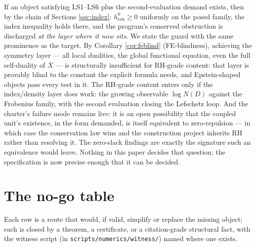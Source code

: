 \documentclass[11pt,reqno]{amsart}
\theoremstyle{plain}
\theoremstyle{definition}
\theoremstyle{remark}
\newcommand{\Xbar}{\overline{X}}
\begin{document}
If an object satisfying LS1--LS6 plus the second-evaluation demand exists, then by the chain
of Sections \ref{sec:index}: $h^0_{\mathrm{ren}} \ge 0$ uniformly on the posed family, the
index inequality holds there, and the program's conserved obstruction is discharged
\emph{at the layer where it now sits}. We state the guard with the same prominence as the
target. By Corollary \ref{cor:feblind} (FE-blindness), achieving the symmetry layer --- all
local dualities, the global functional equation, even the full self-duality of $\Xbar$ ---
is structurally insufficient for RH-grade content: that layer is provably blind to the
constant the explicit formula needs, and Epstein-shaped objects pass every test in it. The
RH-grade content enters only if the index/density layer does work: the growing observable
$\log N(D)$ against the Frobenius family, with the second evaluation closing the Lefschetz
loop. And the charter's failure mode remains live: it is an open possibility that the
coupled unit's existence, in the form demanded, is itself equivalent to zero-repulsion ---
in which case the conservation law wins and the construction project inherits RH rather than
resolving it. The zero-slack findings are exactly the signature such an equivalence would
leave. Nothing in this paper decides that question; the specification is now precise enough
that it can be decided.

\appendix

\section{The no-go table}\label{app:nogo}

Each row is a route that would, if valid, simplify or replace the missing object; each is
closed by a theorem, a certificate, or a citation-grade structural fact, with the witness
script (in \texttt{scripts/\allowbreak numerics/\allowbreak witness/}) named where one
exists.
\end{document}

